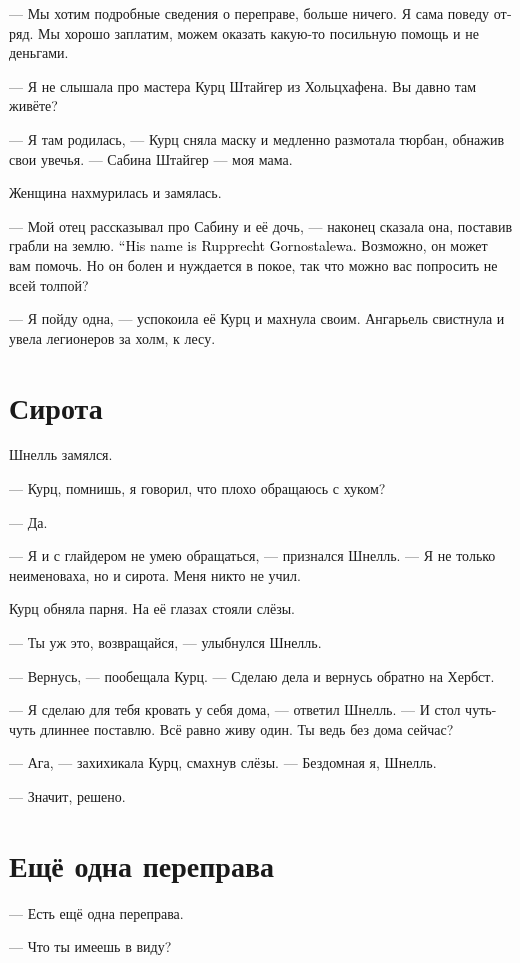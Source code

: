 \documentclass[a4paper,12pt,fleqn]{book}\usepackage{cooltooltips}\usepackage{polyglossia}\setdefaultlanguage[babelshorthands=true]{russian}\setotherlanguage{english}\defaultfontfeatures{Ligatures=TeX,Mapping=tex-text} \usepackage{xcolor}\definecolor{lightgray}{HTML}{bbbbbb}\color{lightgray}\newcommand{\ml}[3]{\textenglish{\textcolor{black}{#3}}}
\begin{document}
--- Мы хотим подробные сведения о переправе, больше ничего.
Я сама поведу отряд.
Мы хорошо заплатим, можем оказать какую-то посильную помощь и не деньгами.

--- Я не слышала про мастера Курц Штайгер из Хольцхафена.
Вы давно там живёте?

--- Я там родилась, --- Курц сняла маску и медленно размотала тюрбан, обнажив свои увечья.
--- Сабина Штайгер --- моя мама.

Женщина нахмурилась и замялась.

--- Мой отец рассказывал про Сабину и её дочь, --- наконец сказала она, поставив грабли на землю.
\ml{$0$}
{--- Его зовут Руппрехт Горносталева.}
{``His name is Rupprecht Gornostalewa.}
Возможно, он может вам помочь.
Но он болен и нуждается в покое, так что можно вас попросить не всей толпой?

--- Я пойду одна, --- успокоила её Курц и махнула своим.
Ангарьель свистнула и увела легионеров за холм, к лесу.

\section{Сирота}

Шнелль замялся.

--- Курц, помнишь, я говорил, что плохо обращаюсь с хуком?

--- Да.

--- Я и с глайдером не умею обращаться, --- признался Шнелль.
--- Я не только неименоваха, но и сирота.
Меня никто не учил.

Курц обняла парня.
На её глазах стояли слёзы.

--- Ты уж это, возвращайся, --- улыбнулся Шнелль.

--- Вернусь, --- пообещала Курц.
--- Сделаю дела и вернусь обратно на Хербст.

--- Я сделаю для тебя кровать у себя дома, --- ответил Шнелль.
--- И стол чуть-чуть длиннее поставлю.
Всё равно живу один.
Ты ведь без дома сейчас?

--- Ага, --- захихикала Курц, смахнув слёзы.
--- Бездомная я, Шнелль.

--- Значит, решено.

\section{Ещё одна переправа}

--- Есть ещё одна переправа.

--- Что ты имеешь в виду?
\end{document}
